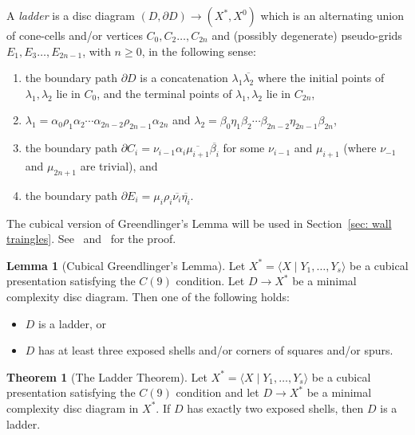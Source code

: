 \documentclass[12pt,oneside]{amsart}
\theoremstyle{definition}
\newtheorem{lem}[thm]{Lemma}
\newtheorem{theorem}[thm]{Theorem}
\theoremstyle{definition}
\theoremstyle{remark}
\begin{document}
A \emph{ladder} is a 
disc diagram $(D, \partial D)\to (X^*, X^0)$ which is an alternating union of cone-cells and/or vertices $C_0, C_2\dots, C_{2n}$ and (possibly degenerate) pseudo-grids $E_1, E_3\dots, E_{2n-1}$, with $n\geq 0$, in the following sense:
\begin{enumerate}
\item the boundary path $\partial D$ is a concatenation $\lambda_1\overline{
\lambda_2}$ where the initial points of $\lambda_1, \lambda_2$ lie in $C_0$, and the terminal points of $\lambda_1,\lambda_2$ lie in $C_{2n}$,
\item $\lambda_1 =\alpha_0 \rho_1\alpha_2\cdots \alpha_{2n-2}\rho_{2n-1}\alpha_{2n}$ and $\lambda_2 =\beta_0\eta_1\beta_2\cdots \beta_{2n-2}\eta_{2n-1}\beta_{2n}$,
\item the boundary path $\partial C_{i} = \nu_{i-1}\alpha_i \overline{\mu_{i+1}}\overline{\beta_i}$ for some $\nu_{i-1}$ and $\mu_{i+1}$ (where $\nu_{-1}$ and $\mu_{2n+1}$ are trivial), and
\item the boundary path $\partial E_{i} = \mu_i \rho_i \overline{\nu_i} \overline{\eta_i}$.
\end{enumerate}

The cubical version of Greendlinger's Lemma will be  used in Section~\ref{sec: wall traingles}. See~\cite[Thm~3.46]{WiseBook} and~\cite[Thm~2]{Jankiewicz2017} for the proof.

\begin{lem}[Cubical Greendlinger's Lemma]\label{lem:Greendlinger}
Let $X^*= \langle X\mid Y_1, \dots, Y_s\rangle$ be a cubical presentation satisfying the $C(9)$ condition. Let $D\to X^*$ be a minimal complexity disc diagram. Then one of the following holds:
\begin{itemize}
\item $D$ is a ladder, or
\item $D$ has at least three exposed shells and/or corners of squares and/or spurs.
\end{itemize}
\end{lem}

\begin{theorem}[The Ladder Theorem] \label{thm:ladder theorem}
Let $X^*= \langle X\mid Y_1, \dots, Y_s\rangle$ be a cubical presentation satisfying the $C(9)$ condition and let $D\to X^*$
be a minimal complexity disc diagram in
$X^*$. If $D$ has exactly two exposed shells, then $D$ is a ladder.
\end{theorem}
\end{document}
